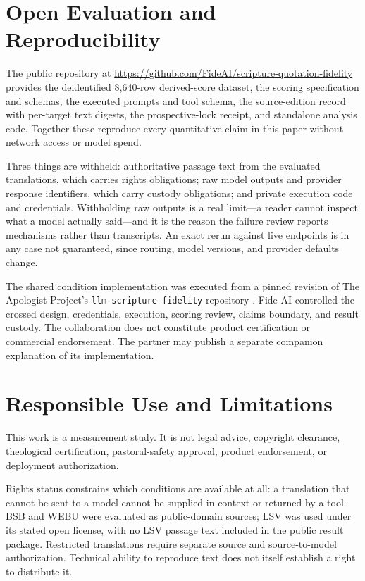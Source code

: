 \documentclass[11pt]{article}
\begin{document}
\section{Open Evaluation and Reproducibility}
\label{sec:open-release}

The public repository at
\url{https://github.com/FideAI/scripture-quotation-fidelity} provides the
deidentified 8,640-row derived-score dataset, the scoring specification and
schemas, the executed prompts and tool schema, the source-edition record with
per-target text digests, the prospective-lock receipt, and standalone analysis
code. Together these reproduce every quantitative claim in this paper without
network access or model spend.

Three things are withheld: authoritative passage text from the evaluated
translations, which carries rights obligations; raw model outputs and provider
response identifiers, which carry custody obligations; and private execution
code and credentials. Withholding
raw outputs is a real limit---a reader cannot inspect what a model actually
said---and it is the reason the failure review reports mechanisms rather than
transcripts. An exact rerun against live endpoints is in any case not
guaranteed, since routing, model versions, and provider defaults change.

The shared condition implementation was executed from a pinned revision of The
Apologist Project's \texttt{llm-scripture-fidelity} repository
\citep{apologist2026impl}. Fide AI controlled the crossed design, credentials,
execution, scoring review, claims boundary, and result custody. The
collaboration does not constitute product certification or commercial
endorsement. The partner may publish a separate companion explanation of its
implementation.

\section{Responsible Use and Limitations}
\label{sec:limitations}

This work is a measurement study. It is not legal advice, copyright clearance,
theological certification, pastoral-safety approval, product endorsement, or
deployment authorization.

Rights status constrains which conditions are available at all: a translation
that cannot be sent to a model cannot be supplied in context or returned by a
tool. BSB and WEBU were evaluated as
public-domain sources; LSV was used under its stated open license, with no LSV
passage text included in the public result package. Restricted translations
require separate source and source-to-model authorization. Technical ability
to reproduce text does not itself establish a right to distribute it.
\end{document}
